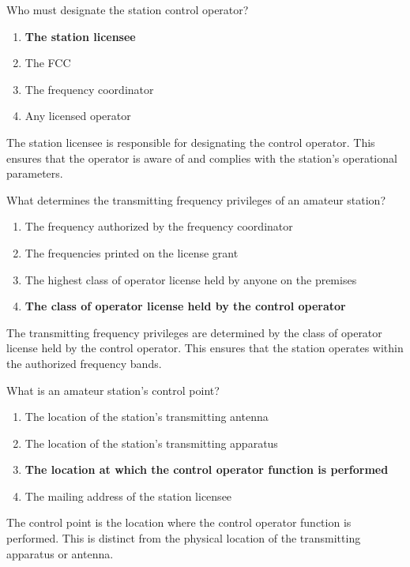 \begin{tcolorbox}[colback=gray!10!white,colframe=black!75!black,title={T1E03}]
Who must designate the station control operator?
\begin{enumerate}[label=\Alph*),noitemsep]
    \item \textbf{The station licensee}
    \item The FCC
    \item The frequency coordinator
    \item Any licensed operator
\end{enumerate}
\end{tcolorbox}
The station licensee is responsible for designating the control operator. This ensures that the operator is aware of and complies with the station's operational parameters.


\begin{tcolorbox}[colback=gray!10!white,colframe=black!75!black,title={T1E04}]
What determines the transmitting frequency privileges of an amateur station?
\begin{enumerate}[label=\Alph*),noitemsep]
    \item The frequency authorized by the frequency coordinator
    \item The frequencies printed on the license grant
    \item The highest class of operator license held by anyone on the premises
    \item \textbf{The class of operator license held by the control operator}
\end{enumerate}
\end{tcolorbox}
The transmitting frequency privileges are determined by the class of operator license held by the control operator. This ensures that the station operates within the authorized frequency bands.


\begin{tcolorbox}[colback=gray!10!white,colframe=black!75!black,title={T1E05}]
What is an amateur station’s control point?
\begin{enumerate}[label=\Alph*),noitemsep]
    \item The location of the station’s transmitting antenna
    \item The location of the station’s transmitting apparatus
    \item \textbf{The location at which the control operator function is performed}
    \item The mailing address of the station licensee
\end{enumerate}
\end{tcolorbox}
The control point is the location where the control operator function is performed. This is distinct from the physical location of the transmitting apparatus or antenna.

